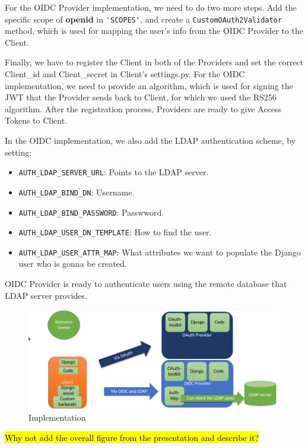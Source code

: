 For the OIDC Provider implementation, we need to do two more steps. Add the specific scope of \textbf{openid} in \verb|'SCOPES'|, and create a \verb|CustomOAuth2Validator| method, which is used for mapping the user's info from the OIDC Provider to the Client. 



Finally, we have to register the Client in both of the Providers and set the correct Client\_id and Client\_secret in Client's settings.py. For the OIDC implementation, we need to provide an algorithm, which is used for signing the JWT that the Provider sends back to Client, for which we used the RS256 algorithm. After the registration process, Providers are ready to give Access Tokens to Client.

In the OIDC implementation, we also add the LDAP authentication scheme, by setting:

\begin{itemize}

	\item \verb|AUTH_LDAP_SERVER_URL|: Points to the LDAP server.

	\item \verb|AUTH_LDAP_BIND_DN|: Username.

	\item \verb|AUTH_LDAP_BIND_PASSWORD|: Passwword.

	\item \verb|AUTH_LDAP_USER_DN_TEMPLATE|: How to find the user.

	\item \verb|AUTH_LDAP_USER_ATTR_MAP|: What attributes we want to populate the Django user who is gonna be created.

\end{itemize}
OIDC Provider is ready to authenticate users using the remote database that LDAP server provides.


\begin{figure}[htb]
	\centering
	\hspace*{-2cm}
	\includegraphics[scale=0.5]{figures/implementation.png}
	\caption{Implementation}
\end{figure}


\hl{Why not add the overall figure from the presentation and describe it?}
